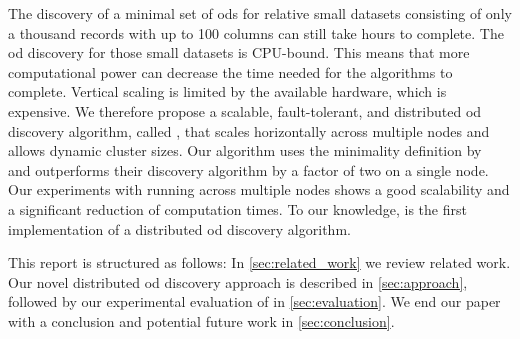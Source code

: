  The discovery of a minimal set of \glspl{od} for relative small datasets consisting of only a thousand records with up to 100 columns can still take hours to complete.
  The \gls{od} discovery for those small datasets is CPU-bound.
  This means that more computational power can decrease the time needed for the algorithms to complete.
  Vertical scaling is limited by the available hardware, which is expensive.
  We therefore propose a scalable, fault-tolerant, and distributed \gls{od} discovery algorithm, called \dodo{}, that scales horizontally across multiple nodes and allows dynamic cluster sizes.
  Our algorithm uses the minimality definition by \citeauthor{consonni}~\cite{consonni} and outperforms their discovery algorithm \ocddiscover{} by a factor of two on a single node.
  Our experiments with running \dodo{} across multiple nodes shows a good scalability and a significant reduction of computation times.
  To our knowledge, \dodo{} is the first implementation of a distributed \gls{od} discovery algorithm.

  This report is structured as follows:
  In \cref{sec:related_work} we review related work.
  Our novel distributed \gls{od} discovery approach \dodo{} is described in \cref{sec:approach}, followed by our experimental evaluation of \dodo{} in \cref{sec:evaluation}.
  We end our paper with a conclusion and potential future work in \cref{sec:conclusion}.
